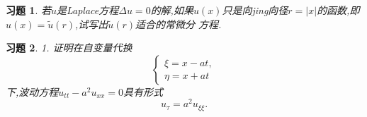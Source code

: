 \documentclass[a4paper,oneside,12pt]{ctexart}
\theoremstyle{plain}
\newtheorem{exercise}{习题}[section]
\theoremstyle{nonumberplain}
\theoremstyle{nonumberplain}
\newcommand{\abs}[1]{\left\vert#1\right\vert}
\begin{document}
    \begin{exercise}
        \label{1.4}
        若$u$是Laplace方程$\Delta u=0$的解,如果$u(x)$只是向jing向径$r=\abs{x}$的函数,即$u(x)=\tilde{u}(r)$,试写出$\tilde{u}(r)$适合的常微分
        方程.
    \end{exercise}

    \begin{exercise}
        \label{ex:1.5}
        1. 证明在自变量代换
        \begin{equation*}
            \begin{cases}
                \xi=x-at,\\
                \eta=x+at
            \end{cases}
        \end{equation*}
        下,波动方程$u_{tt}-a^2u_{xx}=0$具有形式
        \begin{equation*}
            u_\tau=a^2u_{\xi\xi}.
        \end{equation*}
    \end{exercise}
\end{document}

